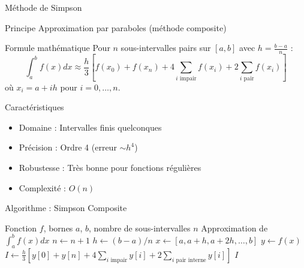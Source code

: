 \documentclass[aspectratio=169,11pt]{beamer}
\begin{document}
\begin{frame}{Méthode de Simpson}
\vspace{-0.2cm}
\begin{block}{Principe}
\small Approximation par paraboles (méthode composite)
\end{block}

\vspace{-0.15cm}
\begin{block}{Formule mathématique}
\small
Pour $n$ sous-intervalles pairs sur $[a,b]$ avec $h = \frac{b-a}{n}$ :
\begin{equation}
\int_a^b f(x) dx \approx \frac{h}{3} \left[ f(x_0) + f(x_n) + 4\sum_{i \text{ impair}} f(x_i) + 2\sum_{i \text{ pair}} f(x_i) \right]
\end{equation}
où $x_i = a + ih$ pour $i=0,\ldots,n$.
\end{block}

\vspace{-0.15cm}
\begin{block}{Caractéristiques}
\small
\begin{itemize}
\item Domaine : Intervalles finis quelconques
\item Précision : Ordre 4 (erreur $\sim h^4$)
\item Robustesse : Très bonne pour fonctions régulières
\item Complexité : $O(n)$
\end{itemize}
\end{block}
\end{frame}

\begin{frame}{Algorithme : Simpson Composite}
\vspace{-0.3cm}
\begin{algorithm}[H]
\caption{Méthode de Simpson Composite}
\small
\begin{algorithmic}[1]
\REQUIRE Fonction $f$, bornes $a$, $b$, nombre de sous-intervalles $n$
\ENSURE Approximation de $\int_a^b f(x) dx$
    \STATE $n \leftarrow n+1$ 
\ENDIF
\STATE $h \leftarrow (b-a)/n$
\STATE $x \leftarrow [a, a+h, a+2h, \ldots, b]$ 
\STATE $y \leftarrow f(x)$ 
\STATE $I \leftarrow \frac{h}{3} \left[ y[0] + y[n] + 4\sum_{i \text{ impair}} y[i] + 2\sum_{i \text{ pair interne}} y[i] \right]$
\RETURN $I$
\end{algorithmic}
\end{algorithm}
\end{frame}
\end{document}
